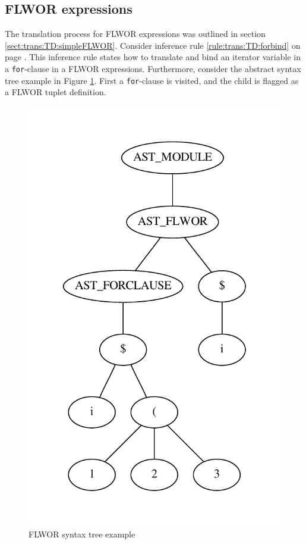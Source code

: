 \subsection{FLWOR expressions}
The translation process for FLWOR expressions was outlined in section
\ref{sect:trans:TD:simpleFLWOR}. Consider inference rule
\ref{rule:trans:TD:forbind} on page \pageref{rule:trans:TD:forbind}. This
inference rule states how to translate and bind an iterator variable in a
\texttt{for}-clause in a FLWOR expressions. Furthermore, consider the abstract
syntax tree example in Figure \ref{fig:impl:td:flwor2}. First a
\texttt{for}-clause is visited, and the  child is flagged as a FLWOR tuplet
definition.
% 

\begin{figure}[!htp]
\begin{center}
  \includegraphics[scale=0.4]{img/graphs/flwor2}
  \caption{FLWOR syntax tree example}
  \label{fig:impl:td:flwor2}
\end{center}
\end{figure} 

